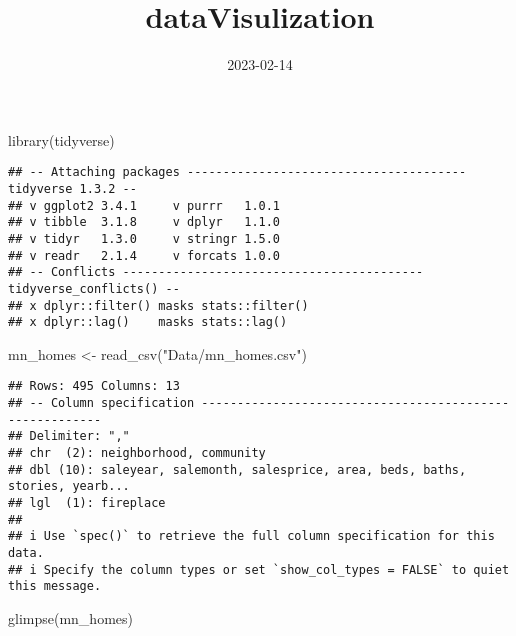 \documentclass[
]{article}
\title{dataVisulization}
\author{}
\date{\vspace{-2.5em}2023-02-14}
\newenvironment{Shaded}{\begin{snugshade}}{\end{snugshade}}
\newcommand{\FunctionTok}[1]{\textcolor[rgb]{0.00,0.00,0.00}{#1}}
\newcommand{\NormalTok}[1]{#1}
\newcommand{\OtherTok}[1]{\textcolor[rgb]{0.56,0.35,0.01}{#1}}
\newcommand{\StringTok}[1]{\textcolor[rgb]{0.31,0.60,0.02}{#1}}
\begin{document}
\maketitle

\begin{Shaded}
\begin{Highlighting}[]
\FunctionTok{library}\NormalTok{(tidyverse)}
\end{Highlighting}
\end{Shaded}

\begin{verbatim}
## -- Attaching packages --------------------------------------- tidyverse 1.3.2 --
## v ggplot2 3.4.1     v purrr   1.0.1
## v tibble  3.1.8     v dplyr   1.1.0
## v tidyr   1.3.0     v stringr 1.5.0
## v readr   2.1.4     v forcats 1.0.0
## -- Conflicts ------------------------------------------ tidyverse_conflicts() --
## x dplyr::filter() masks stats::filter()
## x dplyr::lag()    masks stats::lag()
\end{verbatim}

\begin{Shaded}
\begin{Highlighting}[]
\NormalTok{mn\_homes }\OtherTok{\textless{}{-}} \FunctionTok{read\_csv}\NormalTok{(}\StringTok{"Data/mn\_homes.csv"}\NormalTok{)}
\end{Highlighting}
\end{Shaded}

\begin{verbatim}
## Rows: 495 Columns: 13
## -- Column specification --------------------------------------------------------
## Delimiter: ","
## chr  (2): neighborhood, community
## dbl (10): saleyear, salemonth, salesprice, area, beds, baths, stories, yearb...
## lgl  (1): fireplace
## 
## i Use `spec()` to retrieve the full column specification for this data.
## i Specify the column types or set `show_col_types = FALSE` to quiet this message.
\end{verbatim}

\begin{Shaded}
\begin{Highlighting}[]
\FunctionTok{glimpse}\NormalTok{(mn\_homes)}
\end{Highlighting}
\end{Shaded}
\end{document}
